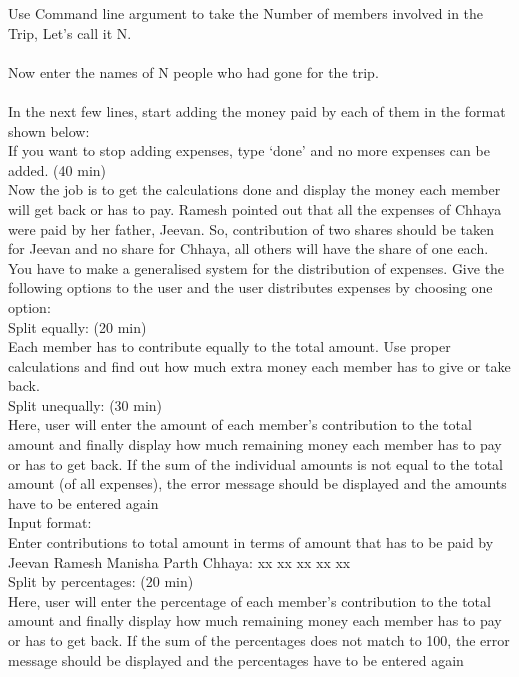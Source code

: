\documentclass[12pt]{article}
\begin{document}
Use Command line argument to take the Number of members involved in the Trip, Let’s call it N.\\
\\
Now enter the names of N people who had gone for the trip.\\
\\
In the next few lines, start adding the money paid by each of them in the format shown below:\\

If you want to stop adding expenses, type ‘done’ and no more expenses can be added.    (40 min) \\ 

Now the job is to get the calculations done and display the money each member will get back or has to pay. Ramesh pointed out that all the expenses of Chhaya were paid by her father, Jeevan. So, contribution of two shares should be taken for Jeevan and no share for Chhaya, all others will have the share of one each.\\

You have to make a generalised system for the distribution of expenses. Give the following options to the user and the user distributes expenses by choosing one option:    \\ 
Split equally:                                    (20 min)\\
Each member has to contribute equally to the total amount. Use proper calculations and find out how much extra money each member has to give or take back.\\
Split unequally:                                (30 min)\\
Here, user will enter the amount of each member’s contribution to the total amount and finally display how much remaining money each member has to pay or has to get back. If the sum of the individual amounts is not equal to the total amount (of all expenses), the error message should be displayed and the amounts have to be entered again \\
Input format:\\
Enter contributions to total amount in terms of amount that has to be paid by Jeevan Ramesh Manisha Parth Chhaya: xx xx xx xx xx\\
Split by percentages:                                (20 min)\\
Here, user will enter the percentage of each member’s contribution to the total amount and finally display how much remaining money each member has to pay or has to get back. If the sum of the percentages does not match to 100, the error message should be displayed and the percentages have to be entered again\\
\end{document}
